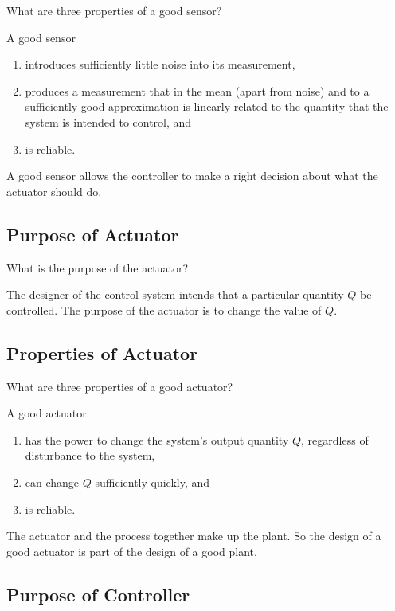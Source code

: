 \begin{prob}
   What are three properties of a good sensor?
\end{prob}

A good sensor
\begin{enumerate}
   \item introduces sufficiently little noise into its measurement,
   \item produces a measurement that in the mean (apart from noise) and to a
      sufficiently good approximation is linearly related to the quantity that
      the system is intended to control, and
   \item is reliable.
\end{enumerate}
A good sensor allows the controller to make a right decision about what the
actuator should do.

\subsection{Purpose of Actuator}

\begin{prob}
   What is the purpose of the actuator?
\end{prob}

The designer of the control system intends that a particular quantity $Q$ be
controlled. The purpose of the actuator is to change the value of $Q$.

\subsection{Properties of Actuator}

\begin{prob}
   What are three properties of a good actuator?
\end{prob}

A good actuator
\begin{enumerate}
   \item has the power to change the system's output quantity $Q$, regardless
      of disturbance to the system,
   \item can change $Q$ sufficiently quickly, and
   \item is reliable.
\end{enumerate}
The actuator and the process together make up the plant. So the design of a
good actuator is part of the design of a good plant.

\subsection{Purpose of Controller}

